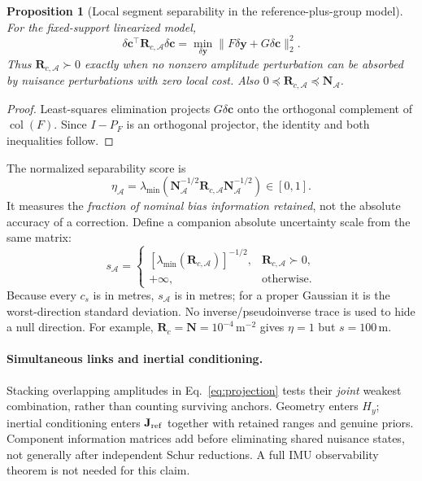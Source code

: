 \documentclass[conference]{IEEEtran}
\newtheorem{proposition}{Proposition}
\newcommand{\A}{\mathcal A}
\newcommand{\N}{\mathbf N}
\newcommand{\Rc}{\mathbf R}
\begin{document}
\begin{proposition}[Local segment separability in the reference-plus-group model]
\label{prop:separability}
For the fixed-support linearized model,
\begin{equation}
 \delta\mathbf c^\top\Rc_{c,\A}\delta\mathbf c
 =\min_{\delta\mathbf y}\|F\delta\mathbf y+G\delta\mathbf c\|_2^2.
 \label{eq:profile}
\end{equation}
Thus $\Rc_{c,\A}\succ0$ exactly when no nonzero amplitude perturbation can be absorbed by nuisance perturbations with zero local cost. Also $0\preceq\Rc_{c,\A}\preceq\N_\A$.
\end{proposition}
\begin{proof}
Least-squares elimination projects $G\delta\mathbf c$ onto the orthogonal complement of $\operatorname{col}(F)$. Since $I-P_F$ is an orthogonal projector, the identity and both inequalities follow.
\end{proof}

The normalized separability score is
\begin{equation}
 \eta_\A=\lambda_{\min}
 (\N_\A^{-1/2}\Rc_{c,\A}\N_\A^{-1/2})\in[0,1].
 \label{eq:eta}
\end{equation}
It measures the \emph{fraction of nominal bias information retained}, not the absolute accuracy of a correction. Define a companion absolute uncertainty scale from the same matrix:
\begin{equation}
 s_\A=\begin{cases}
  [\lambda_{\min}(\Rc_{c,\A})]^{-1/2},&\Rc_{c,\A}\succ0,\\
  +\infty,&\text{otherwise}.
 \end{cases}
 \label{eq:sigma}
\end{equation}
Because every $c_s$ is in metres, $s_\A$ is in metres; for a proper Gaussian it is the worst-direction standard deviation. No inverse/pseudoinverse trace is used to hide a null direction. For example, $\Rc_c=\N=10^{-4}\,\mathrm{m}^{-2}$ gives $\eta=1$ but $s=100\,\mathrm m$.

\paragraph{Simultaneous links and inertial conditioning.}
Stacking overlapping amplitudes in Eq.~\eqref{eq:projection} tests their \emph{joint} weakest combination, rather than counting surviving anchors. Geometry enters $H_y$; inertial conditioning enters $\mathbf J_{\rm ref}$ together with retained ranges and genuine priors. Component information matrices add before eliminating shared nuisance states, not generally after independent Schur reductions. A full IMU observability theorem is not needed for this claim.
\end{document}
